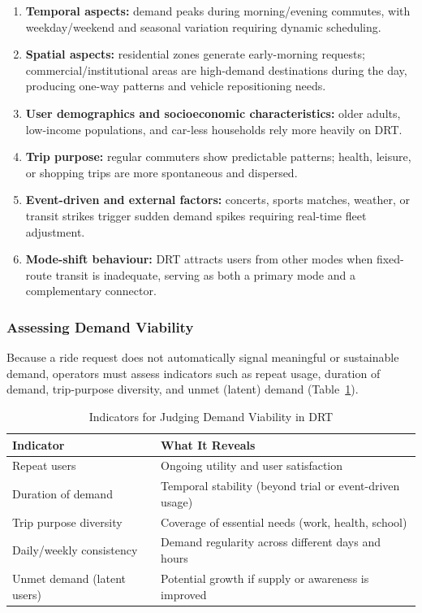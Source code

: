 \documentclass[12pt]{article}
\begin{document}
\begin{enumerate}[nosep]
  \item \textbf{Temporal aspects:} demand peaks during morning/evening commutes,
    with weekday/weekend and seasonal variation requiring dynamic scheduling.
  \item \textbf{Spatial aspects:} residential zones generate early-morning
    requests; commercial/institutional areas are high-demand destinations during
    the day, producing one-way patterns and vehicle repositioning needs.
  \item \textbf{User demographics and socioeconomic characteristics:} older
    adults, low-income populations, and car-less households rely more heavily on
    DRT.
  \item \textbf{Trip purpose:} regular commuters show predictable patterns;
    health, leisure, or shopping trips are more spontaneous and dispersed.
  \item \textbf{Event-driven and external factors:} concerts, sports matches,
    weather, or transit strikes trigger sudden demand spikes requiring real-time
    fleet adjustment.
  \item \textbf{Mode-shift behaviour:} DRT attracts users from other modes when
    fixed-route transit is inadequate, serving as both a primary mode and a
    complementary connector.
\end{enumerate}

\subsubsection{Assessing Demand Viability}

Because a ride request does not automatically signal meaningful or sustainable
demand, operators must assess indicators such as repeat usage, duration of demand,
trip-purpose diversity, and unmet (latent) demand (Table~\ref{tab:viability}).

\begin{table}[H]
\centering
\caption{Indicators for Judging Demand Viability in DRT}
\label{tab:viability}
\small
\begin{tabular}{p{4.5cm}p{9cm}}
\toprule
\textbf{Indicator} & \textbf{What It Reveals} \\
\midrule
Repeat users & Ongoing utility and user satisfaction \\
Duration of demand & Temporal stability (beyond trial or event-driven usage) \\
Trip purpose diversity & Coverage of essential needs (work, health, school) \\
Daily/weekly consistency & Demand regularity across different days and hours \\
Unmet demand (latent users) & Potential growth if supply or awareness is improved \\
\bottomrule
\end{tabular}
\end{table}
\end{document}
